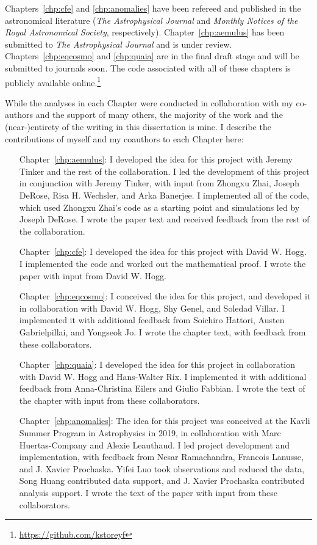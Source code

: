 Chapters~\ref{chp:cfe} and \ref{chp:anomalies} have been refereed and published in the astronomical literature (\emph{The Astrophysical Journal} and \emph{Monthly Notices of the Royal Astronomical Society}, respectively).
Chapter~\ref{chp:aemulus} has been submitted to \emph{The Astrophysical Journal} and is under review.
Chapters~\ref{chp:eqcosmo} and \ref{chp:quaia} are in the final draft stage and will be submitted to journals soon.
The code associated with all of these chapters is publicly available online.\footnote{\url{https://github.com/kstoreyf}}

While the analyses in each Chapter were conducted in collaboration with my co-authors and the support of many others, the majority of the work and the (near-)entirety of the writing in this dissertation is mine. 
I describe the contributions of myself and my coauthors to each Chapter here:
\begin{enumerate}[leftmargin=4\parindent]
    \item[Chapter~\ref{chp:aemulus}:] I developed the idea for this project with Jeremy Tinker and the rest of the \aemulus collaboration. I led the development of this project in conjunction with Jeremy Tinker, with input from Zhongxu Zhai, Joseph DeRose, Risa H. Wechsler, and Arka Banerjee. I implemented all of the code, which used Zhongxu Zhai's code as a starting point and simulations led by Joseph DeRose. I wrote the paper text and received feedback from the rest of the collaboration.
    \item[Chapter~\ref{chp:cfe}:] I developed the idea for this project with David W. Hogg. I implemented the code and worked out the mathematical proof. I wrote the paper with input from David W. Hogg.
    \item[Chapter~\ref{chp:eqcosmo}:] I conceived the idea for this project, and developed it in collaboration with David W. Hogg, Shy Genel, and Soledad Villar. I implemented it with additional feedback from Soichiro Hattori, Austen Gabrielpillai, and Yongseok Jo. I wrote the chapter text, with feedback from these collaborators.
    \item[Chapter~\ref{chp:quaia}:] I developed the idea for this project in collaboration with David W. Hogg and Hans-Walter Rix. I implemented it with additional feedback from Anna-Christina Eilers and Giulio Fabbian. I wrote the text of the chapter with input from these collaborators.
    \item[Chapter~\ref{chp:anomalies}:] The idea for this project was conceived at the Kavli Summer Program in Astrophysics in 2019, in collaboration with Marc Huertas-Company and Alexie Leauthaud. I led project development and implementation, with feedback from Nesar Ramachandra, Francois Lanusse, and J. Xavier Prochaska. Yifei Luo took observations and reduced the data, Song Huang contributed data support, and J. Xavier Prochaska contributed analysis support. I wrote the text of the paper with input from these collaborators.
\end{enumerate}



